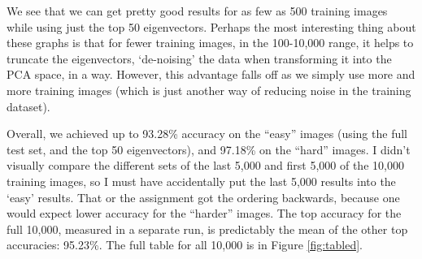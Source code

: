 \documentclass[11pt]{report}
\begin{document}
We see that we can get pretty good results for as few as 500 training images while using just the top 50 eigenvectors. Perhaps the most interesting thing about these graphs is that for fewer training images, in the 100-10,000 range, it helps to truncate the eigenvectors, `de-noising' the data when transforming it into the PCA space, in a way. However, this advantage falls off as we simply use more and more training images (which is just another way of reducing noise in the training dataset).


Overall, we achieved up to 93.28\% accuracy on the ``easy'' images (using the full test set, and the top 50 eigenvectors), and 97.18\% on the ``hard'' images. I didn't visually compare the different sets of the last 5,000 and first 5,000 of the 10,000 training images, so I must have accidentally put the last 5,000 results into the `easy' results. That or the assignment got the ordering backwards, because one would expect lower accuracy for the ``harder'' images. The top accuracy for the full 10,000, measured in a separate run, is predictably the mean of the other top accuracies: 95.23\%. The full table for all 10,000 is in Figure \ref{fig:tabled}.
\end{document}
